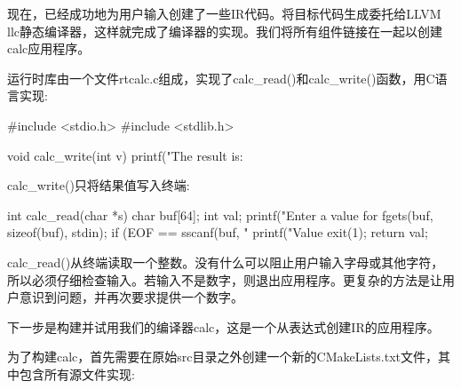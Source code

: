 现在，已经成功地为用户输入创建了一些IR代码。将目标代码生成委托给LLVM llc静态编译器，这样就完成了编译器的实现。我们将所有组件链接在一起以创建calc应用程序。

运行时库由一个文件rtcalc.c组成，实现了calc\_read()和calc\_write()函数，用C语言实现:

\begin{cpp}
#include <stdio.h>
#include <stdlib.h>

void calc_write(int v)
{
    printf("The result is: %
}
\end{cpp}

calc\_write()只将结果值写入终端:

\begin{cpp}
int calc_read(char *s)
{
    char buf[64];
    int val;
    printf("Enter a value for %
    fgets(buf, sizeof(buf), stdin);
    if (EOF == sscanf(buf, "%
    {
        printf("Value %
        exit(1);
    }
    return val;
}
\end{cpp}

calc\_read()从终端读取一个整数。没有什么可以阻止用户输入字母或其他字符，所以必须仔细检查输入。若输入不是数字，则退出应用程序。更复杂的方法是让用户意识到问题，并再次要求提供一个数字。

下一步是构建并试用我们的编译器calc，这是一个从表达式创建IR的应用程序。


为了构建calc，首先需要在原始src目录之外创建一个新的CMakeLists.txt文件，其中包含所有源文件实现:

